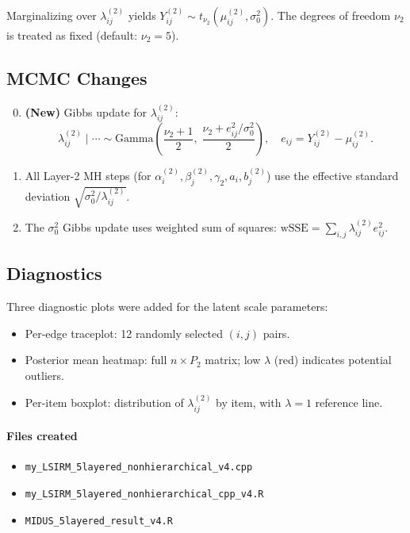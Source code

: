 \documentclass[11pt]{article}
\begin{document}
Marginalizing over $\lambda_{ij}^{(2)}$ yields $Y_{ij}^{(2)} \sim t_{\nu_2}(\mu_{ij}^{(2)}, \sigma_0^2)$.
The degrees of freedom $\nu_2$ is treated as fixed (default: $\nu_2=5$).

\subsection{MCMC Changes}

\begin{enumerate}[label=\textbf{Step \arabic*.}, leftmargin=3em]
  \setcounter{enumi}{-1}
  \item \textbf{(New)} Gibbs update for $\lambda_{ij}^{(2)}$:
  \[
    \lambda_{ij}^{(2)} \mid \cdots \sim \text{Gamma}\!\left(\frac{\nu_2+1}{2},\;\frac{\nu_2 + e_{ij}^2/\sigma_0^2}{2}\right),
    \quad e_{ij} = Y_{ij}^{(2)} - \mu_{ij}^{(2)}.
  \]
  \item All Layer-2 MH steps (for $\alpha_i^{(2)}, \beta_j^{(2)}, \gamma_2, a_i, b_j^{(2)}$) use the effective standard deviation $\sqrt{\sigma_0^2/\lambda_{ij}^{(2)}}$.
  \item The $\sigma_0^2$ Gibbs update uses weighted sum of squares: $\text{wSSE} = \sum_{i,j} \lambda_{ij}^{(2)} e_{ij}^2$.
\end{enumerate}

\subsection{Diagnostics}

Three diagnostic plots were added for the latent scale parameters:
\begin{itemize}[leftmargin=1.5em]
  \item Per-edge traceplot: 12 randomly selected $(i,j)$ pairs.
  \item Posterior mean heatmap: full $n \times P_2$ matrix; low $\lambda$ (red) indicates potential outliers.
  \item Per-item boxplot: distribution of $\lambda_{ij}^{(2)}$ by item, with $\lambda=1$ reference line.
\end{itemize}

\paragraph{Files created}
\begin{itemize}[leftmargin=1.5em]
  \item \texttt{my\_LSIRM\_5layered\_nonhierarchical\_v4.cpp}
  \item \texttt{my\_LSIRM\_5layered\_nonhierarchical\_cpp\_v4.R}
  \item \texttt{MIDUS\_5layered\_result\_v4.R}
\end{itemize}
\end{document}
